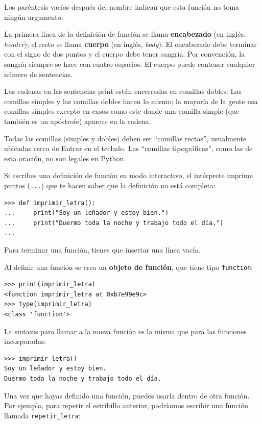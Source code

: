 \documentclass[10pt]{book}
\begin{document}
Los paréntesis vacíos después del nombre indican que esta función
no toma ningún argumento.

La primera línea de la definición de función se llama {\bf encabezado} (en inglés, {\em header});
el resto se llama {\bf cuerpo} (en inglés, {\em body}).  El encabezado debe terminar con el signo de dos puntos
y el cuerpo debe tener sangría.  Por convención, la sangría
siempre se hace con cuatro espacios.  El cuerpo puede contener
cualquier número de sentencias.

Las cadenas en las sentencias print están encerradas en comillas
dobles.  Las comillas simples y las comillas dobles hacen lo mismo;
la mayoría de la gente usa comillas simples excepto en casos como este donde
una comilla simple (que también es un apóstrofe) aparece en la cadena.

Todas las comillas (simples y dobles)
deben ser ``comillas rectas'', usualmente
ubicadas cerca de Entrar en el teclado.  Las ``comillas tipográficas'', como
las de esta oración, no son legales en Python.

Si escribes una definición de función en modo interactivo, el intérprete
imprime puntos ({\tt ...}) que te hacen saber que la definición
no está completa:

\begin{verbatim}
>>> def imprimir_letra():
...     print("Soy un leñador y estoy bien.")
...     print("Duermo toda la noche y trabajo todo el día.")
...
\end{verbatim}
%
Para terminar una función, tienes que insertar una línea vacía.

Al definir una función se crea un {\bf objeto de función}, que tiene
tipo \verb"function":

\begin{verbatim}
>>> print(imprimir_letra)
<function imprimir_letra at 0xb7e99e9c>
>>> type(imprimir_letra)
<class 'function'>
\end{verbatim}
%
La sintaxis para llamar a la nueva función es la misma que
para las funciones incorporadas:

\begin{verbatim}
>>> imprimir_letra()
Soy un leñador y estoy bien.
Duermo toda la noche y trabajo todo el día.
\end{verbatim}
%
Una vez que hayas definido una función, puedes usarla dentro de otra
función.  Por ejemplo, para repetir el estribillo anterior, podríamos escribir
una función llamada \verb"repetir_letra":
\end{document}
